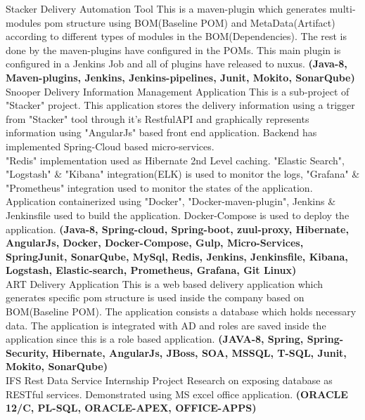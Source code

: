 \documentclass[]{cv-class}
\begin{document}
\begin{entrylist}
\entry
    {}
	{Stacker}
    {Delivery Automation Tool}
	{This is a maven-plugin which generates multi-modules pom structure using BOM(Baseline POM) and MetaData(Artifact) according to different types of 			modules in the BOM(Dependencies). The rest is done by the maven-plugins have configured in the POMs. This main plugin is configured in a Jenkins Job 		and all of plugins have released to nuxus. \textbf{(Java-8, Maven-plugins, Jenkins, Jenkins-pipelines, Junit, Mokito, SonarQube)}}
	\entry
    {}
	{Snooper}
    {Delivery Information Management Application}
	{This is a sub-project of "Stacker" project. This application stores the delivery information using a trigger from "Stacker" tool through it's RestfulAPI and graphically represents information using "AngularJs" based front end application. Backend has implemented Spring-Cloud based micro-services. \\"Redis" implementation used as Hibernate 2nd Level caching. "Elastic Search", "Logstash" \& "Kibana" integration(ELK) is used to monitor the logs, "Grafana" \& "Prometheus" integration used to monitor the states of the application. Application containerized using "Docker", "Docker-maven-plugin", Jenkins \& Jenkinsfile used to build the application. Docker-Compose is used to deploy the application. \textbf{(Java-8, Spring-cloud, Spring-boot, zuul-proxy, Hibernate, AngularJs, Docker, Docker-Compose, Gulp, Micro-Services, SpringJunit, SonarQube, MySql, Redis, Jenkins, Jenkinsfile, Kibana, Logstash, Elastic-search, Prometheus, Grafana, Git  Linux)}}
	\\
\entry
    {}
	{ART}    
    {Delivery Application}
{This is a web based delivery application which generates specific pom structure is used inside the company based on BOM(Baseline POM). The application consists a database which holds necessary data. The application is integrated with AD and roles are saved inside the application since this is a role based application. \textbf{(JAVA-8, Spring, Spring-Security, Hibernate, AngularJs, JBoss, SOA, MSSQL, T-SQL, Junit, Mokito, SonarQube)}}
\\
  	\entry
    {}
    {IFS Rest Data Service}
    {Internship Project}
    {Research on exposing database as  RESTful  services. Demonstrated  using  MS  excel  office  application. \textbf{(ORACLE 12/C, PL-SQL, ORACLE-APEX, OFFICE-APPS)}}
	\\
\end{entrylist}
\end{document}
